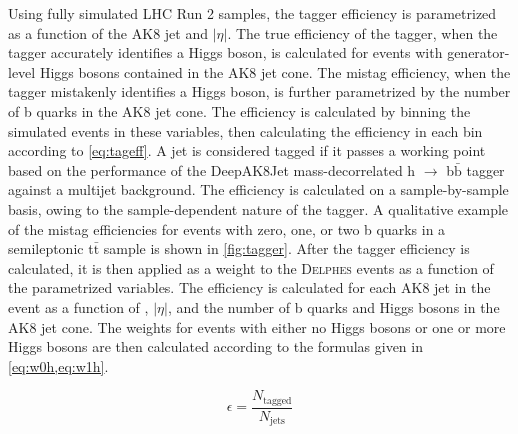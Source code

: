 Using fully simulated LHC Run 2 samples, the tagger efficiency is parametrized as a function of the AK8 jet \pt and $|\eta|$. The true efficiency of the tagger, when the tagger accurately identifies a Higgs boson, is calculated for events with generator-level Higgs bosons contained in the AK8 jet cone. The mistag efficiency, when the tagger mistakenly identifies a Higgs boson, is further parametrized by the number of b quarks in the AK8 jet cone. The efficiency is calculated by binning the simulated events in these variables, then calculating the efficiency in each bin according to \cref{eq:tageff}. A jet is considered tagged if it passes a working point based on the performance of the DeepAK8Jet mass-decorrelated h $\to$ b$\bar{\mathrm{b}}$ tagger against a multijet background. The efficiency is calculated on a sample-by-sample basis, owing to the sample-dependent nature of the tagger. A qualitative example of the mistag efficiencies for events with zero, one, or two b quarks in a semileptonic t$\bar{\mathrm{t}}$ sample is shown in \cref{fig:tagger}. After the tagger efficiency is calculated, it is then applied as a weight to the \textsc{Delphes} events as a function of the parametrized variables. The efficiency is calculated for each AK8 jet in the event as a function of \pt, $|\eta|$, and the number of b quarks and Higgs bosons in the AK8 jet cone. The weights for events with either no Higgs bosons or one or more Higgs bosons are then calculated according to the formulas given in \cref{eq:w0h,eq:w1h}.

\begin{equation}
    \epsilon = \frac{N_\text{tagged}}{N_\text{jets}}
    \label{eq:tageff}
\end{equation}

